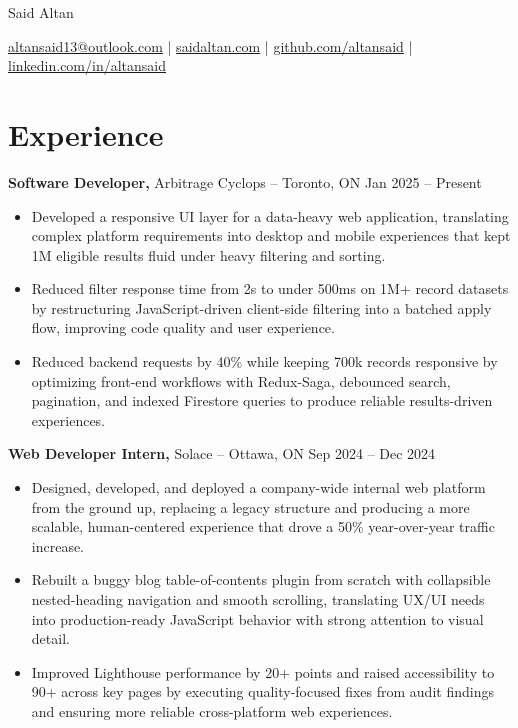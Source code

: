 \documentclass[11pt]{article}       %
\begin{document}
\centerline{\Huge Said Altan}

\vspace{10pt}

\centerline{\href{mailto:altansaid13@outlook.com}{altansaid13@outlook.com} | \href{https://saidaltan.com}{saidaltan.com} | \href{https://github.com/altansaid}{github.com/altansaid} | \href{https://www.linkedin.com/in/altansaid}{linkedin.com/in/altansaid}}


\vspace{5pt}
\section*{Experience}
\textbf{Software Developer,} {Arbitrage Cyclops} -- Toronto, ON \hfill Jan 2025 -- Present \\
\vspace{-9pt}
\begin{itemize}
  \item Developed a responsive UI layer for a data-heavy web application, translating complex platform requirements into desktop and mobile experiences that kept 1M eligible results fluid under heavy filtering and sorting.
  \item Reduced filter response time from 2s to under 500ms on 1M+ record datasets by restructuring JavaScript-driven client-side filtering into a batched apply flow, improving code quality and user experience.
  \item Reduced backend requests by 40\% while keeping 700k records responsive by optimizing front-end workflows with Redux-Saga, debounced search, pagination, and indexed Firestore queries to produce reliable results-driven experiences.
\end{itemize}

\textbf{Web Developer Intern,} {Solace} -- Ottawa, ON \hfill Sep 2024 -- Dec 2024 \\
\vspace{-9pt}
\begin{itemize}
  \item Designed, developed, and deployed a company-wide internal web platform from the ground up, replacing a legacy structure and producing a more scalable, human-centered experience that drove a 50\% year-over-year traffic increase.
  \item Rebuilt a buggy blog table-of-contents plugin from scratch with collapsible nested-heading navigation and smooth scrolling, translating UX/UI needs into production-ready JavaScript behavior with strong attention to visual detail.
  \item Improved Lighthouse performance by 20+ points and raised accessibility to 90+ across key pages by executing quality-focused fixes from audit findings and ensuring more reliable cross-platform web experiences.
\end{itemize}
\end{document}
